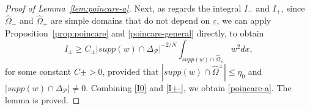 \documentclass[a4paper,12pt,fullpage]{article}
\numberwithin{equation}{section}
\def\ep{\varepsilon}
\begin{document}
\begin{proof}[Proof of Lemma~\ref{lem:poincare-a}]
Next, as regards the integral $I_{-}$ and $I_{+}$, since $\widehat\Omega_-$ and $\widehat\Omega_+$ are simple domains that do not depend on $\ep$, we can apply Proposition~\ref{prop:poincare} and \eqref{poincare-general} directly, to obtain
\begin{equation}\label{I+-}
I_{\pm}\geq C_\pm |supp(w)\cap\Delta_{\mathcal P}|^{-2/N}\int_{supp(w)\cap \widehat\Omega_{\pm}} w^2 dx,
\end{equation}
for some constant $C\pm>0$, provided that $|supp(w)\cap\widehat\Omega^{\pm}|\leq \eta_0$ and $|supp(w)\cap\Delta_{\mathcal P}|\ne 0$. Combining \eqref{I0} and \eqref{I+-}, we obtain \eqref{poincare-a}. The lemma is proved.
\end{proof}

\end{document}
